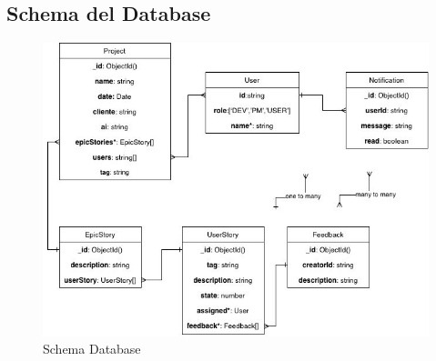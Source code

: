 \documentclass{article}
\begin{document}
\subsection{Schema del Database}
\begin{figure}[H]
      \centering
      \includegraphics[width=\textwidth]{documenti/Screenshot manuale utente/UMLDB.png}
      \caption{Schema Database}
      \label{fig: archser}
    \end{figure}
\end{document}
